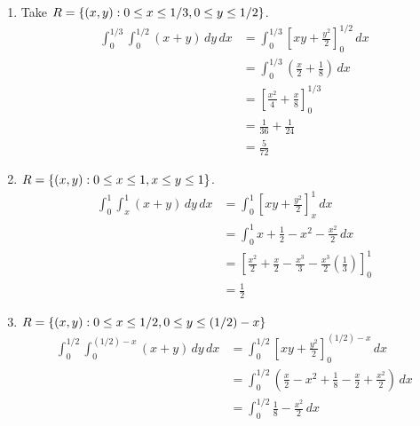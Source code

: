 \begin{Example}{}{}
\begin{enumerate}[label=(\roman*)]
\begin{enumerate}[label=(\alph*)]
                  \item Take $ R=\{(x,y):0\le x\le 1/3, 0\le y
                                \le 1/2\} $.
                        \begin{align*}
                            \int_{0}^{1/3} \int_{0}^{1/2} (x+y)\, d{y} \, d{x}
                             & =\int_{0}^{1/3}
                            \left[ xy +\frac{y^2}{2}  \right]_0^{1/2}\, d{x}                  \\
                             & =\int_{0}^{1/3} \left( \frac{x}{2} +\frac{1}{8} \right)\, d{x} \\
                             & =\left[ \frac{x^2}{4}+\frac{x}{8} \right]_0^{1/3}              \\
                             & =\frac{1}{36}+\frac{1}{24}                                     \\
                             & =\frac{5}{72}
                        \end{align*}
                  \item $ R=\{(x,y):0\le x\le 1,x\le y\le 1\} $.
                        \begin{align*}
                            \int_{0}^{1} \int_{x}^{1} (x+y)\, d{y} \, d{x}
                             & =\int_{0}^{1} \left[ xy +\frac{y^2}{2}  \right]_x^1 \, d{x} \\
                             & =\int_{0}^{1} x+\frac{1}{2}-x^2-\frac{x^2}{2}\, d{x}        \\
                             & =\left[ \frac{x^2}{2} +\frac{x}{2} -\frac{x^3}{3}-
                            \frac{x^3}{2}\left( \frac{1}{3} \right)  \right]_0^1           \\
                             & =\frac{1}{2}
                        \end{align*}
                  \item $ R=\{(x,y):0\le x\le
                                1/2,0\le y\le (1/2)-x \} $
                        \begin{align*}
                            \int_{0}^{1/2} \int_{0}^{(1/2)-x} (x+y)\, d{y} \, d{x}
                             & =\int_{0}^{1/2} \left[ xy+\frac{y^2}{2} \right]_{0}^{(1/2)-x}\, d{x}           \\
                             & =\int_{0}^{1/2} \left( \frac{x}{2} -x^2+\frac{1}{8}
                            -\frac{x}{2} +\frac{x^2}{2}   \right)\, d{x}                                      \\
                             & =\int_{0}^{1/2} \frac{1}{8} -\frac{x^2}{2}\, d{x}                              \\

\end{align*}
\end{enumerate}
\end{enumerate}
\end{Example}
